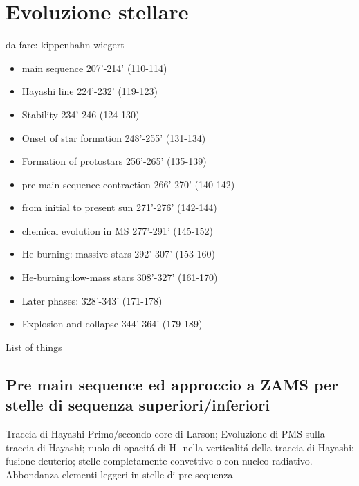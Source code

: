 \section{Evoluzione stellare}

\begin{wordonframe}{da fare: kippenhahn wiegert}
\begin{itemize}
\item main sequence 207'-214' (110-114)
\item Hayashi line 224'-232' (119-123)
\item Stability 234'-246 (124-130)
\item Onset of star formation 248'-255' (131-134)
\item Formation of protostars 256'-265' (135-139)
\item pre-main sequence contraction 266'-270' (140-142)
\item from initial to present sun 271'-276' (142-144)
\item chemical evolution in MS 277'-291' (145-152)
\item He-burning: massive stars 292'-307' (153-160)
\item He-burning:low-mass stars 308'-327' (161-170)
\item Later phases:  328'-343' (171-178)
\item Explosion and collapse 344'-364' (179-189)
\end{itemize}
\end{wordonframe}

\begin{frame}[allowframebreaks]{List of things}
\listofkeywords
\end{frame}

\subsection{Pre main sequence ed approccio a ZAMS per stelle di sequenza superiori/inferiori}

\begin{frame}{Traccia di Hayashi}
Primo/secondo core di Larson; Evoluzione di PMS sulla traccia di Hayashi; ruolo di opacit\'a di H- nella verticalit\'a della traccia di Hayashi; fusione deuterio; stelle completamente convettive o con nucleo radiativo. Abbondanza elementi leggeri in stelle di pre-sequenza
\end{frame}

